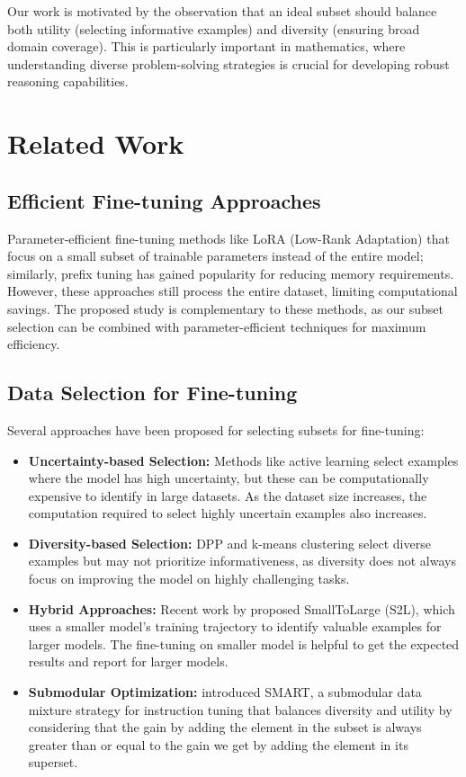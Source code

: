 \documentclass{article}
\begin{document}
Our work is motivated by the observation that an ideal subset should balance both utility (selecting informative examples) and diversity (ensuring broad domain coverage). This is particularly important in mathematics, where understanding diverse problem-solving strategies is crucial for developing robust reasoning capabilities.

\section{Related Work}

\subsection{Efficient Fine-tuning Approaches}

Parameter-efficient fine-tuning methods like LoRA (Low-Rank Adaptation) \cite{hu2020lora} that focus on a small subset of trainable parameters instead of the entire model; similarly, prefix tuning has gained popularity for reducing memory requirements. However, these approaches still process the entire dataset, limiting computational savings. The proposed study is complementary to these methods, as our subset selection can be combined with parameter-efficient techniques for maximum efficiency.

\subsection{Data Selection for Fine-tuning}

Several approaches have been proposed for selecting subsets for fine-tuning:

\begin{itemize}
\item \textbf{Uncertainty-based Selection:} Methods like active learning select examples where the model has high uncertainty, but these can be computationally expensive to identify in large datasets. As the dataset size increases, the computation required to select highly uncertain examples also increases.
\item \textbf{Diversity-based Selection:} DPP and k-means clustering select diverse examples but may not prioritize informativeness, as diversity does not always focus on improving the model on highly challenging tasks.
\item \textbf{Hybrid Approaches:} Recent work by \cite{yang2024smalltolarge} proposed SmallToLarge (S2L), which uses a smaller model's training trajectory to identify valuable examples for larger models. The fine-tuning on smaller model is helpful to get the expected results and report for larger models.
\item \textbf{Submodular Optimization:} \cite{renduchintala2024smart} introduced SMART, a submodular data mixture strategy for instruction tuning that balances diversity and utility by considering that the gain by adding the element in the subset is always greater than or equal to the gain we get by adding the element in its superset.
\end{itemize}
\end{document}
